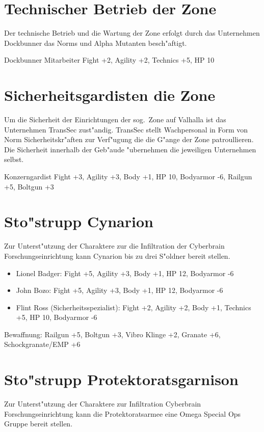 \section{Technischer Betrieb der Zone}

Der technische Betrieb und die Wartung der Zone erfolgt durch das Unternehmen Dockbunner das Norms und Alpha Mutanten 
besch"aftigt.

Dockbunner Mitarbeiter Fight +2, Agility +2, Technics +5, HP 10

\section{Sicherheitsgardisten die Zone}

Um die Sicherheit der Einrichtungen der sog.~Zone auf Valhalla ist das Unternehmen TransSec zust"andig. TransSec stellt
Wachpersonal in Form von Norm Sicherheitskr"aften zur Verf"ugung die die G"ange der Zone patroullieren. Die Sicherheit
innerhalb der Geb"aude "ubernehmen die jeweiligen Unternehmen selbst.

Konzerngardist Fight +3, Agility +3, Body +1, HP 10, Bodyarmor -6, Railgun +5, Boltgun +3

\section{Sto"strupp Cynarion}

Zur Unterst"utzung der Charaktere zur die Infiltration der Cyberbrain Forschungseinrichtung kann Cynarion bis zu 
drei S"oldner bereit stellen.

\begin{itemize}
    \item Lionel Badger: Fight +5, Agility +3, Body +1, HP 12, Bodyarmor -6
    \item John Bozo: Fight +5, Agility +3, Body +1, HP 12, Bodyarmor -6
    \item Flint Ross (Sicherheitsspezialist): Fight +2, Agility +2, Body +1, Technics +5, HP 10, Bodyarmor -6
\end{itemize}

Bewaffnung: Railgun +5, Boltgun +3, Vibro Klinge +2, Granate +6, Schockgranate/EMP +6 

\section{Sto"strupp Protektoratsgarnison}

Zur Unterst"utzung der Charaktere zur Infiltration  Cyberbrain Forschungseinrichtung kann die Protektoratsarmee eine 
Omega Special Ops Gruppe bereit stellen.

